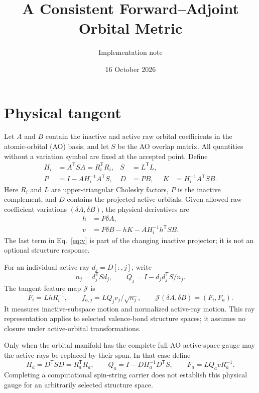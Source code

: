 \documentclass[11pt,a4paper]{article}
\title{A Consistent Forward--Adjoint Orbital Metric}
\author{Implementation note}
\date{16 October 2026}
\newcommand{\Tr}{^{\mathsf T}}
\begin{document}
\maketitle

\section{Physical tangent}
Let $A$ and $B$ contain the inactive and active raw orbital coefficients in
the atomic-orbital (AO) basis, and let $S$ be the AO overlap matrix.
All quantities without a variation symbol are fixed at the accepted point.
Define
\begin{align}
 H_i&=A\Tr SA=R_i\Tr R_i, & S&=L\Tr L,\\
 P&=I-AH_i^{-1}A\Tr S, & D&=PB, & K&=H_i^{-1}A\Tr SB.
\end{align}
Here $R_i$ and $L$ are upper-triangular Cholesky factors, $P$ is the inactive
complement, and $D$ contains the projected active orbitals. Given allowed
raw-coefficient variations $(\delta A,\delta B)$, the physical derivatives are
\begin{align}
 h&=P\delta A,\\
 v&=P\delta B-hK-AH_i^{-1}h\Tr SB. \label{eq:v}
\end{align}
The last term in Eq.~\eqref{eq:v} is part of the changing inactive projector;
it is not an optional structure response.

For an individual active ray $d_j=D[:,j]$, write
\begin{equation}
 n_j=d_j\Tr Sd_j,\qquad Q_j=I-d_jd_j\Tr S/n_j.
\end{equation}
The tangent feature map $\mathcal J$ is
\begin{equation}
 F_i=LhR_i^{-1},\qquad f_{a,j}=LQ_jv_j/\sqrt{n_j},\qquad
 \mathcal J(\delta A,\delta B)=(F_i,F_a).
 \label{eq:feature}
\end{equation}
It measures inactive-subspace motion and normalized active-ray motion.
This ray representation applies to selected valence-bond structure spaces;
it assumes no closure under active-orbital transformations.

Only when the orbital manifold has the complete full-AO active-space gauge
may the active rays be replaced by their span. In that case define
\begin{equation}
 H_a=D\Tr SD=R_a\Tr R_a,\qquad Q_a=I-DH_a^{-1}D\Tr S,
 \qquad F_a=LQ_avR_a^{-1}. \label{eq:span}
\end{equation}
Completing a computational spin-string carrier does not establish this
physical gauge for an arbitrarily selected structure space.
\end{document}
